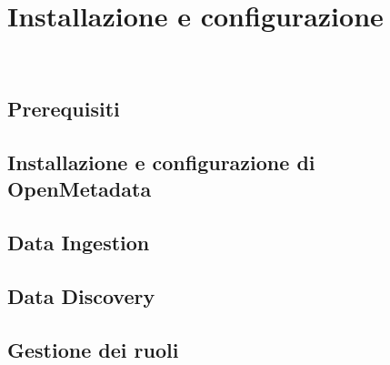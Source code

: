 \chapter{Installazione e configurazione}
\label{cap:installazione}

\\

\section{Prerequisiti}

\section{Installazione e configurazione di OpenMetadata}

\section{Data Ingestion}

\section{Data Discovery}

\section{Gestione dei ruoli}

